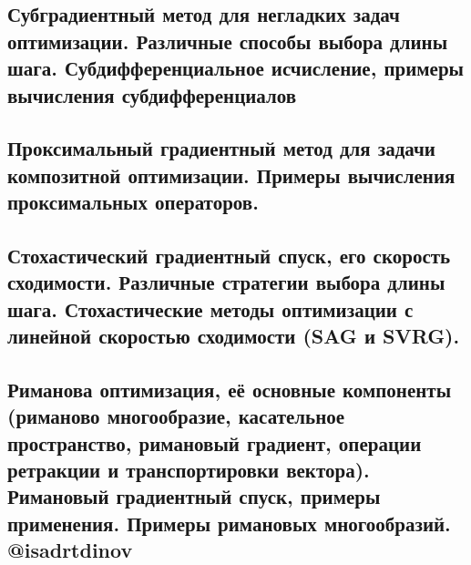 \documentclass[a4paper, 16pt]{article}
\begin{document}
    

    \subsection{Субградиентный метод для негладких задач оптимизации. Различные способы выбора длины шага. Субдифференциальное исчисление, примеры вычисления субдифференциалов}

    

    \subsection{Проксимальный градиентный метод для задачи композитной оптимизации. Примеры вычисления проксимальных операторов.}

    

    \subsection{Стохастический градиентный спуск, его скорость сходимости. Различные стратегии выбора длины шага. Стохастические методы оптимизации с линейной скоростью сходимости (SAG и SVRG).}

    

    \subsection{Риманова оптимизация, её основные компоненты (риманово многообразие, касательное пространство, римановый градиент, операции ретракции и транспортировки вектора). Римановый градиентный спуск, примеры применения. Примеры римановых многообразий. @isadrtdinov}

    
\end{document}
